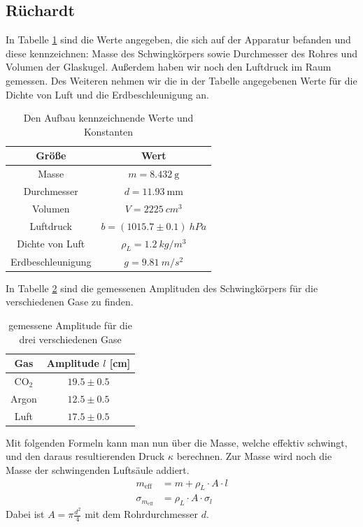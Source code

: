 \documentclass[12pt,a4paper,titlepage,headinclude,bibtotoc]{scrartcl}
\begin{document}
\subsection{Rüchardt}
In Tabelle \ref{tab:RuechardtWerte} sind die Werte angegeben, die sich auf der Apparatur befanden und diese kennzeichnen: Masse des Schwingkörpers sowie Durchmesser des Rohres und Volumen der Glaskugel.
Außerdem haben wir noch den Luftdruck im Raum gemessen.
Des Weiteren nehmen wir die in der Tabelle angegebenen Werte für die Dichte von Luft und die Erdbeschleunigung an.
\begin{table}[!htb]
	\centering
	\begin{tabular}{|c|c|}
		\hline
		Größe & Wert\\
		\hline
		\hline
		Masse & $m = 8.432~\si{\gram}$\\
		Durchmesser & $d = 11.93~\si{\milli\meter}$\\
		Volumen & $V = 2225~\si{cm^3}$\\
		\hline
		Luftdruck & $b = (1015.7 \pm 0.1)~\si{hPa}$\\ 		
		\hline
		Dichte von Luft & $\rho_L = 1.2~\si{kg/m^3}$\\
		Erdbeschleunigung & $g = 9.81~\si{m/s^2}$\\		
		\hline
	\end{tabular}
	\caption{Den Aufbau kennzeichnende Werte und Konstanten}
	\label{tab:RuechardtWerte}	
\end{table}
In Tabelle \ref{tab:RuechardtAmpl} sind die gemessenen Amplituden des Schwingkörpers für die verschiedenen Gase zu finden.
\begin{table}[!hbt]
	\centering
	\begin{tabular}{|c|c|}
		\hline
		Gas & Amplitude $l$ [cm]\\
		\hline
		\hline
		CO$_2$& $19.5\pm0.5$\\
		Argon & $12.5\pm0.5$\\
		Luft & $17.5\pm0.5$\\
		\hline
	\end{tabular}
	\caption{gemessene Amplitude für die drei verschiedenen Gase}
	\label{tab:RuechardtAmpl}
\end{table}

Mit folgenden Formeln kann man nun über die Masse, welche effektiv schwingt, und den daraus resultierenden Druck $\kappa$ berechnen.
Zur Masse wird noch die Masse der schwingenden Luftsäule addiert.
\begin{align}
	m_{\text{eff}}&= m + \rho_L \cdot A \cdot l\\
	\sigma_{m_\text{eff}}&=\rho_L \cdot A \cdot \sigma_l
\end{align}
Dabei ist $ A = \pi\frac{d^2}{4}$ mit dem Rohrdurchmesser $d$.
\end{document}
